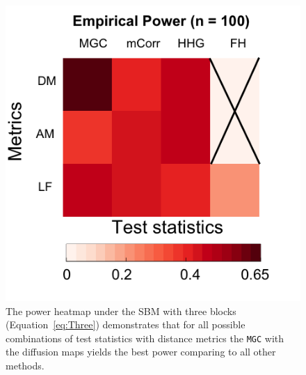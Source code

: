 \documentclass[11pt]{article}
\theoremstyle{definition}
\begin{document}
	\begin{figure}
		\centering
		\includegraphics[width=0.4\paperwidth, height=0.4\paperwidth]{ThreeSBM.png}
		\caption{The power heatmap under the SBM with three blocks (Equation~\ref{eq:Three}) demonstrates that for all possible combinations of test statistics with distance metrics the \texttt{MGC} with the diffusion maps yields the best power comparing to all other methods.}
		\label{fig:threeSBM}
	\end{figure}
	
\end{document}
